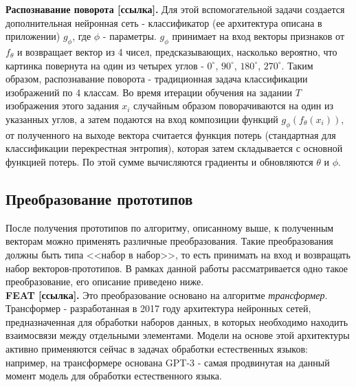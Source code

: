 \documentclass[a4paper, 12pt]{report}
\begin{document}
\textbf {Распознавание поворота [ссылка].} Для этой вспомогательной задачи создается дополнительная нейронная сеть - классификатор (ее архитектура описана в приложении) $g_{\phi}$, где $\phi$ - параметры. $g_{\phi}$ принимает на вход векторы признаков от $f_{\theta}$ и возвращает вектор из 4 чисел, предсказывающих, насколько вероятно, что картинка повернута на один из четырех углов - $0^{\circ}$, $90^{\circ}$, $180^{\circ}$, $270^{\circ}$. Таким образом, распознавание поворота - традиционная задача классификации изображений по 4 классам. Во время итерации обучения на задании $T$ изображения этого задания $x_{i}$ случайным образом поворачиваются на один из указанных углов, а затем подаются на вход композиции функций $g_{\phi}(f_{\theta}(x_i))$, от полученного на выходе вектора считается функция потерь (стандартная для классификации перекрестная энтропия), которая затем складывается с основной функцией потерь. По этой сумме вычисляются градиенты и обновляются $\theta$ и $\phi$.

\subsection{Преобразование прототипов}
После получения прототипов по алгоритму, описанному выше, к полученным векторам можно применять различные преобразования. Такие преобразования должны быть типа <<набор в набор>>, то есть принимать на вход и возвращать набор векторов-прототипов. В рамках данной работы рассматривается одно такое преобразование, его описание приведено ниже.\\

\textbf {FEAT [ссылка].} Это преобразование основано на алгоритме \textit{трансформер}. Трансформер - разработанная в 2017 году архитектура нейронных сетей, предназначенная для обработки наборов данных, в которых необходимо находить взаимосвязи между отдельными элементами. Модели на основе этой архитектуры активно применяются сейчас в задачах обработки естественных языков: например, на трансформере основана GPT-3 - самая продвинутая на данный момент модель для обработки естественного языка. \\
\end{document}
